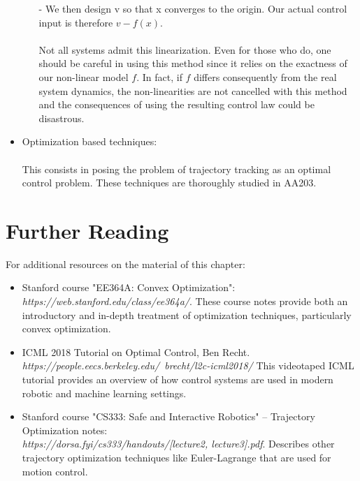 \documentclass[twoside]{article}
\begin{document}
\begin{itemize}
\begin{enumerate}
     - We then design v so that x converges to the origin. Our actual control input is therefore $v - f(x)$. \\
     \\
     Not all systems admit this linearization. Even for those who do, one should be careful in using this method since it relies on the exactness of our non-linear model $f$. In fact, if $f$ differs consequently from the real system dynamics, the non-linearities are not cancelled with this method and the consequences of using the resulting control law could be disastrous.
  \end{enumerate}
  \item Optimization based techniques: \\
  \\
  This consists in posing the problem of trajectory tracking as an optimal control problem. These techniques are thoroughly studied in AA203.
\end{itemize}

\section{Further Reading}
 
 For additional resources on the material of this chapter:
 
 \begin{itemize}
     \item { Stanford course "EE364A: Convex Optimization": \textit{https://web.stanford.edu/class/ee364a/}. These course notes provide both an introductory and in-depth treatment of optimization techniques, particularly convex optimization.
     }
     \item { ICML 2018 Tutorial on Optimal Control, Ben Recht. \textit{ https://people.eecs.berkeley.edu/~brecht/l2c-icml2018/} This videotaped ICML tutorial provides an overview of how control systems are used in modern robotic and machine learning settings.
     }
     \item { Stanford course "CS333: Safe and Interactive Robotics" -- Trajectory Optimization notes: \\
     \textit{https://dorsa.fyi/cs333/handouts/[lecture2, lecture3].pdf}. Describes other trajectory optimization techniques like Euler-Lagrange that are used for motion control.
     }
     
 \end{itemize}
\end{document}
